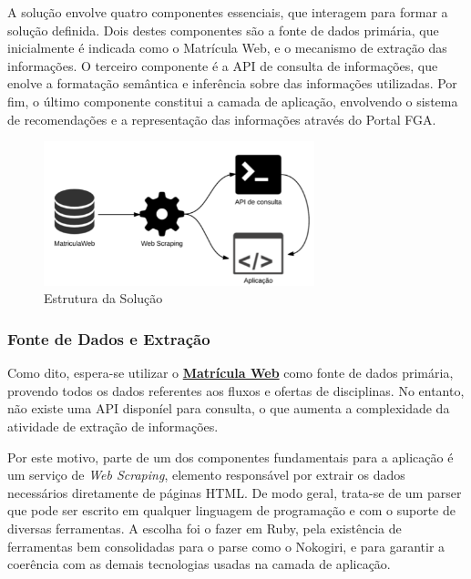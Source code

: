 
A solução envolve quatro componentes essenciais, que interagem para formar a solução definida. Dois destes componentes são a fonte de dados primária, que inicialmente é indicada como o Matrícula Web, e o mecanismo de extração das informações. O terceiro componente é a API de consulta de informações, que enolve a formatação semântica e inferência sobre das informações utilizadas. Por fim, o último componente constitui a camada de aplicação, envolvendo o sistema de recomendações e a representação das informações através do Portal FGA.

\begin{figure}[H]
	\centering
	\includegraphics[width=0.7\textwidth]{imagens/estrutura}
	\caption{Estrutura da Solução}
	\label{img:estrutura}
\end{figure}

\subsubsection{Fonte de Dados e Extração} %
\label{ssub:fonte_de_dados_e_extra_o}

	Como dito, espera-se utilizar o \href{http://matriculaweb.unb.br}{\textbf{Matrícula Web}} como fonte de dados primária, provendo todos os dados referentes aos fluxos e ofertas de disciplinas. No entanto, não existe uma API disponíel para consulta, o que aumenta a complexidade da atividade de extração de informações.

	Por este motivo, parte de um dos componentes fundamentais para a aplicação é um serviço de \textit{Web Scraping}, elemento responsável por extrair os dados necessários diretamente de páginas HTML. De modo geral, trata-se de um parser que pode ser escrito em qualquer linguagem de programação e com o suporte de diversas ferramentas. A escolha foi o fazer em Ruby, pela existência de ferramentas bem consolidadas para o parse como o Nokogiri, e para garantir a coerência com as demais tecnologias usadas na camada de aplicação.


